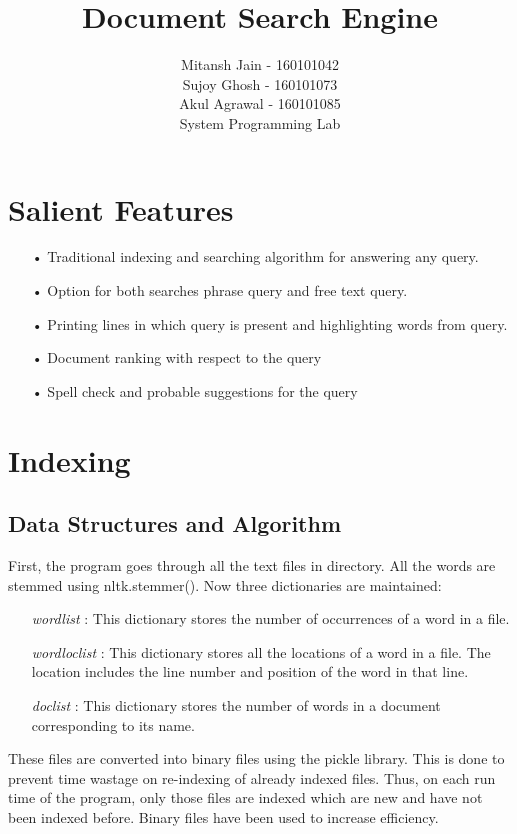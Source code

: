 \documentclass[12pt]{article}
\begin{document}
 
 
 
\title{Document Search Engine}%
\author{Mitansh Jain - 160101042\\
Sujoy Ghosh - 160101073\\
Akul Agrawal - 160101085\\%
System Programming Lab} %
 
\maketitle

\section{Salient Features}
\begin{itemize}
\item[•]Traditional indexing and searching algorithm for answering any query.
\item[•]Option for both searches phrase query and free text query.
\item[•]Printing lines in which query is present and highlighting words from query. 
\item[•]Document ranking with respect to the query
\item[•]Spell check and probable suggestions for the query
\end{itemize}

\section{Indexing}
\subsection{Data Structures and Algorithm}
First, the program goes through all the text files in directory. All the words are stemmed using nltk.stemmer(). Now three dictionaries are maintained:
\begin{itemize}
\item[] \textit{wordlist} : This dictionary stores the number of occurrences of a word in a file.
\item[] \textit{wordloclist} : This dictionary stores all the locations of a word in a file. The location includes the line number and position of the word in that line.
\item[] \textit{doclist} : This dictionary stores the number of words in a document corresponding to its name.
\end{itemize}
These files are converted into binary files using the pickle library.
This is done to prevent time wastage on re-indexing of already indexed
files. Thus, on each run time of the program, only those files are
indexed which are new and have not been indexed before. Binary files
have been used to increase efficiency.
\end{document}
